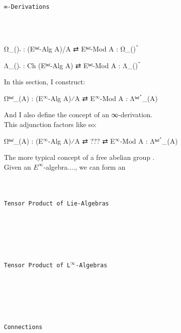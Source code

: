 \documentclass{book}
\theoremstyle{definition}
\renewcommand{\chapter}[1]{
\newpage
{
\Huge 
\begin{center}
\ \\
\ \\
\thispagestyle{empty}
\texttt{#1}
\end{center}}
\ \\
\ \\
}
\begin{document}
\newpage
\chapter{∞-Derivations}

\begin{center}
Ω\_()𛲔 : (Eⁱⁿᶠ-Alg A)/A ⇄ Eⁱⁿᶠ-Mod A : Ω\_()ॱ
\end{center}

\begin{center}
Λ\_()𛲔 : Ch (Eⁱⁿᶠ-Alg A) ⇄ Eⁱⁿᶠ-Mod A : Λ\_()ॱ
\end{center}



In this section, I construct: 

\begin{center}
Ωⁱⁿᶠ\_(A) : (E${}^{\infty}$-Alg A)⁄A ⇄ E${}^{\infty}$-Mod A : Λⁱⁿᶠॱ\_(A)
\end{center}

And I also define the concept of an ∞-derivation.\\

This adjunction factors like so:

\begin{center}
Ωⁱⁿᶠ\_(A) : (E${}^{\infty}$-Alg A)⁄A ⇄ ??? ⇄ E${}^{\infty}$-Mod A : Λⁱⁿᶠॱ\_(A)
\end{center}


The more typical concept of a free abelian group .\\


Given an $E^{\infty}$-algebra...., we can form an \\

\newpage
\chapter{Tensor Product of Lie-Algebras}




\newpage
\chapter{Tensor Product of L${}^{\infty}$-Algebras}




\newpage
\chapter{Connections}
\end{document}
